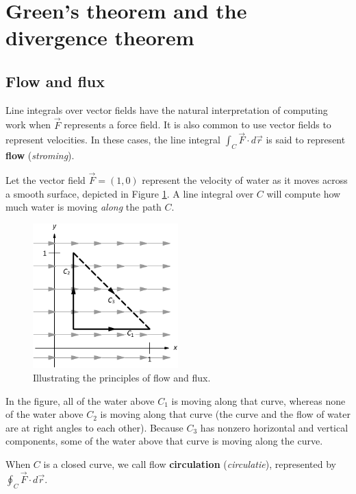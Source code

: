 \section{Green's theorem and the divergence theorem}
\label{sec:greensthm}
\subsection{Flow and flux}
Line integrals over vector fields have the natural interpretation of computing work when $\vec F$ represents a force field. It is also common to use vector fields to represent velocities. In these cases, the line integral $\int_C \vec F\cdot d\vec r$ is said to represent \textbf{flow} (\textit{stroming}).




Let the vector field $\vec F = \left( 1,0\right)$ represent the velocity of water as it moves across a smooth surface, depicted in Figure \ref{fig_Vector_Calc_12}. A line integral over $C$ will compute how much water is moving \textit{along} the path $C$.


\begin{figure}
	\begin{center}
			\includegraphics[width=0.5\textwidth]{fig_Vector_Calc_12}
	\caption{Illustrating the principles of flow and flux.}
	\label{fig_Vector_Calc_12}
	\end{center}
\end{figure}


In the figure, all of the water above $C_1$ is moving along that curve, whereas none of the water above $C_2$ is moving along that curve (the curve and the flow of water are at right angles to each other). Because $C_3$ has nonzero horizontal and vertical components, some of the water above that curve is moving along the curve.

	\checkoddpage
{}
When $C$ is a closed curve, we call flow \textbf{circulation} (\textit{circulatie}), represented by $\oint_C \vec F\cdot d\vec r$.

